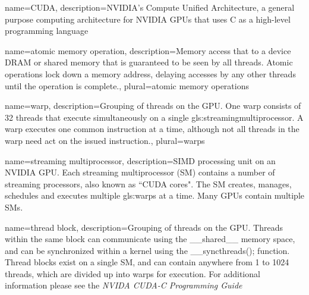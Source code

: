 \makeglossaries









{
  name=CUDA,
  description={NVIDIA's Compute Unified Architecture,
				 a general purpose computing architecture for NVIDIA GPUs that uses C as a high-level programming language}
}

{
  name=atomic memory operation,
  description={Memory access that to a device DRAM or shared memory that is guaranteed to be seen by all threads. Atomic operations lock down a memory address, delaying accesses by any other threads until the operation is complete.},
	plural=atomic memory operations
}

{
  name=warp,
  description={Grouping of threads on the GPU. One warp consists of 32 threads that execute simultaneously on a single \gls{gls:streamingmultiprocessor}. A warp executes one common instruction at a time, although not all threads in the warp need act on the issued instruction.},
	plural=warps
}

{
  name=streaming multiprocessor,
  description={SIMD processing unit on an NVIDIA GPU. Each streaming multiprocessor (SM) contains a number of streaming processors, also known as ``CUDA cores". The SM creates, manages, schedules and executes multiple \glspl{gls:warp} at a time. Many GPUs contain multiple SMs.\cite{NVIDIACorporation2011} }
}

{
  name=thread block,
  description={Grouping of threads on the GPU. Threads within the same block can communicate using the \_\_shared\_\_ memory space, and can be synchronized within a kernel using the \_\_syncthreads(); function. Thread blocks exist on a single SM, and can contain anywhere from 1 to 1024 threads, which are divided up into warps for execution. For additional information please see the \emph{NVIDA CUDA-C Programming Guide}\cite{NVIDIACorporation2011} }
}

